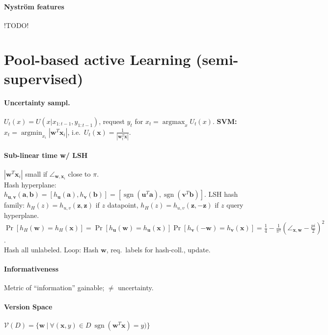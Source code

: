 \documentclass[9pt]{scrartcl}
\DeclareMathOperator{\sign}{sgn}
\DeclareMathOperator{\argmin}{argmin}
\DeclareMathOperator{\argmax}{argmax}
\begin{document}
\begin{twocolumn}
\paragraph{Nyström features}
!TODO!

\section{Pool-based active Learning (semi-supervised)}

\paragraph{Uncertainty sampl.}
$U_t(x) = U(x | x_{1:t-1}, y_{1:t-1})$, request $y_t$ for $x_t = \argmax_x U_t(x)$.
\textbf{SVM:} $x_t = \argmin_{x_i}|\bm w^T\bm x_i|$, i.e.\ $U_t(\bm x) = \frac{1}{|\bm w_t^T \bm x|}$.

\paragraph{Sub-linear time w/ LSH}
$|\bm w^T\bm x_i|$ small if $\angle_{\bm w,\bm x_i}$ close to $\pi$.\\
Hash hyperplane:
$h_{\bm u,\bm v}(\bm a,\bm b) = [h_{\bm u}(\bm a), h_{\bm v}(\bm b)] = [\sign(\bm u^T\bm a),\sign(\bm v^T\bm b)]$.
LSH hash family: $h_H(z) = h_{u,v}(\bm z,\bm z)$ if $z$ datapoint, $h_H(z) = h_{u,v}(\bm z,-\bm z)$ if $z$ query hyperplane.
$\Pr[h_H(\bm w) = h_H(\bm x)] = \Pr[h_{\bm u}(\bm w) = h_{\bm u}(\bm x)]\Pr[h_{\bm v}(-\bm w) = h_{\bm v}(\bm x)] = \frac{1}{4} - \frac{1}{\pi^2}(\angle_{\bm x,\bm w} - \frac{pi}{2})^2$.\\
Hash all unlabeled. Loop: Hash $\bm w$, req.\ labels for hash-coll., update.

\paragraph{Informativeness}
Metric of “information” gainable; $\neq$ uncertainty.
\paragraph{Version Space}
$\mathcal{V}(D) = \{\bm w\ |\ \forall(\bm x,y)\in D\ \sign(\bm w^T\bm x) = y)\}$


\end{twocolumn}
\end{document}
